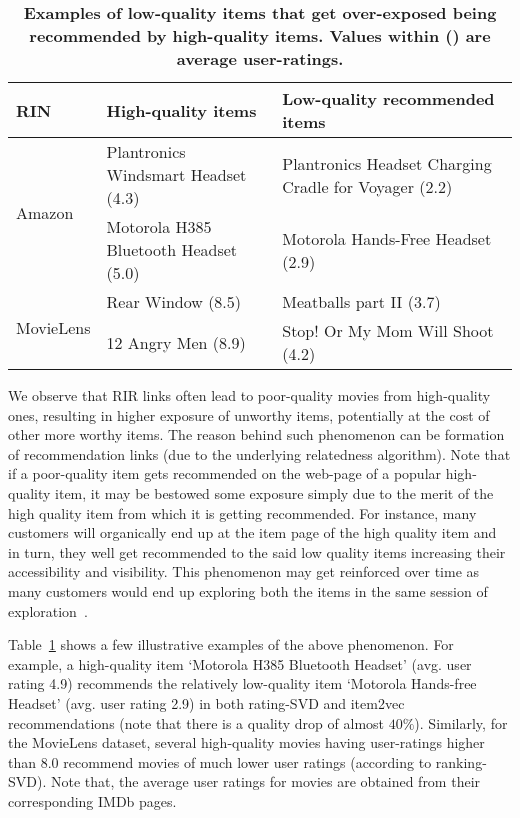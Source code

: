 \begin{table}[tb]
	\noindent
	\scriptsize
	\centering
	\begin{tabular}{ |p{1.3cm}|p{2.5cm}|p{4.0cm}| }
		\hline
		{\bf RIN} & {\bf High-quality items} & {\bf Low-quality recommended items} \\
		\hline
		\multirow{2}{*}{Amazon } & Plantronics Windsmart Headset (4.3) & Plantronics Headset Charging Cradle for Voyager (2.2) \\
		\cline{2-3}
		& Motorola H385 Bluetooth Headset (5.0) & Motorola Hands-Free Headset (2.9) \\
		\hline
		\multirow{2}{*}{MovieLens} & Rear Window (8.5) & Meatballs part II (3.7)\\
		\cline{2-3}
		& 12 Angry Men (8.9) & Stop! Or My Mom Will Shoot (4.2) \\
		\hline
	\end{tabular}	
	\caption{{\bf Examples of low-quality items that get over-exposed being recommended by high-quality items. Values within () are average user-ratings.}}
	\label{Tab: examplesRIN}
	\vspace{-3 mm}
\end{table}


We observe that RIR links often lead to poor-quality movies from high-quality ones,
resulting in higher exposure of unworthy items, potentially at the cost of other more worthy items. The reason behind such phenomenon can be formation of recommendation links (due to the underlying relatedness algorithm). Note that if a poor-quality item gets recommended on the web-page of a popular high-quality item, it may be bestowed some exposure simply due to the merit of the high quality item from which it is getting recommended. For instance, many customers will organically end up at the item page of the high quality item and in turn, they well get recommended to the said low quality items increasing their accessibility and visibility. This phenomenon may get reinforced over time as many customers would end up exploring both the items in the same session of exploration~\cite{dash2021umpire, dash2019network}.

Table~\ref{Tab: examplesRIN} shows a few illustrative examples of the above phenomenon.
For example, a high-quality item `Motorola H385 Bluetooth Headset' (avg. user rating 4.9) recommends the relatively low-quality item `Motorola Hands-free Headset' (avg. user rating 2.9) in both rating-SVD and item2vec recommendations (note that there is a quality drop of almost $40\%$). 
Similarly, for the MovieLens dataset, several high-quality movies having user-ratings higher than $8.0$ recommend movies of much lower user ratings (according to ranking-SVD). Note that, the average user ratings for movies are obtained from their corresponding IMDb pages.



